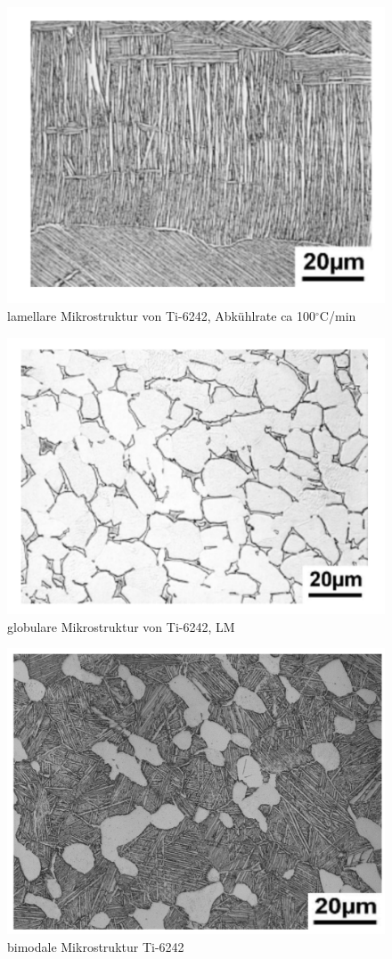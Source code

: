 \begin{itemize}
\begin{figure}[h]
	\centering
	\includegraphics[width=0.7\linewidth]{./Bilder/Abbildung 3.png}
	\caption[Abbildung 3]{lamellare Mikrostruktur von Ti-6242, Abkühlrate ca 100$^\circ$C/min \cite{Lutjering.2007}}
	\label{fig:abbildung-3}
\end{figure}

\begin{figure}[h]
	\centering
	\includegraphics[width=0.7\linewidth]{./Bilder/Abbildung 5.png}
	\caption[Abbildung 5]{globulare Mikrostruktur von Ti-6242, LM \cite{Lutjering.2007}}
	\label{fig:abbildung-5}
\end{figure}

\pagebreak

\begin{figure}[h]
	\centering
	\includegraphics[width=0.6\linewidth]{./Bilder/Abbildung 4.png}
	\caption[Abbildung 4]{bimodale Mikrostruktur Ti-6242}
	\label{fig:abbildung-4}
\end{figure}

\end{itemize} 


